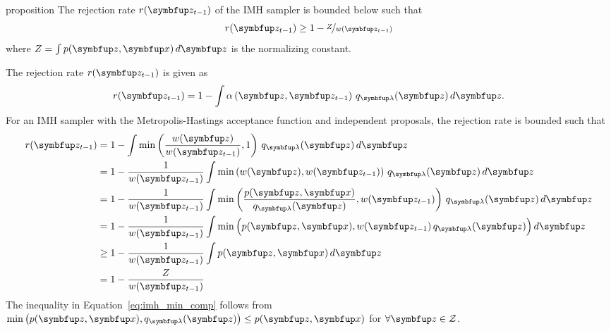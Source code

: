 
\begin{theoremEnd}[]{proposition}\label{thm:imh_bound}
  The rejection rate \(r(\vz_{t-1})\) of the IMH sampler is bounded below such that
  \[
  r(\vz_{t-1}) \geq 1 - \nicefrac{Z}{w(\vz_{t-1})} 
  \]
  where \(Z=\int p(\vz,\vx) \, d\vz\) is the normalizing constant.
\end{theoremEnd}
\begin{proofEnd}
  The rejection rate \(r(\vz_{t-1})\) is given as
  \begin{align}
    r(\vz_{t-1}) = 1 - \int \alpha\left(\vz, \vz_{t-1} \right) \, q_{\vlambda}(\vz) \, d\vz.
  \end{align}
  For an IMH sampler with the Metropolis-Hastings acceptance function and independent proposals, the rejection rate is bounded such that
  \begin{align}
    r(\vz_{t-1})
    &= 1 - \int \min\left(\frac{w(\vz)}{w(\vz_{t-1})}, 1 \right) \, q_{\vlambda}(\vz)\,d\vz \\
    &= 1 - \frac{1}{w(\vz_{t-1})} \int \min\left(w(\vz), w(\vz_{t-1})\right) \, q_{\vlambda}(\vz)\,d\vz \\
    &= 1 - \frac{1}{w(\vz_{t-1})} \int \min\left(\frac{p(\vz,\vx)}{q_{\vlambda}(\vz)}, w(\vz_{t-1})\right) \, q_{\vlambda}(\vz)\,d\vz \\
    &=    1 - \frac{1}{w(\vz_{t-1})} \int \min\Big(p(\vz,\vx), w(\vz_{t-1})\,q_{\vlambda}(\vz)\Big) \, d\vz  \\
    &\geq 1 - \frac{1}{w(\vz_{t-1})} \int p(\vz,\vx) \, d\vz \label{eq:imh_min_comp} \\
    &=    1 - \frac{Z}{w(\vz_{t-1})} 
  \end{align}
  The inequality in Equation~\eqref{eq:imh_min_comp} follows from \(\min\big(p(\vz,\vx), q_{\vlambda}(\vz)\big) \leq p(\vz,\vx) \) for \(\forall \vz \in \mathcal{Z}\).
\end{proofEnd}

